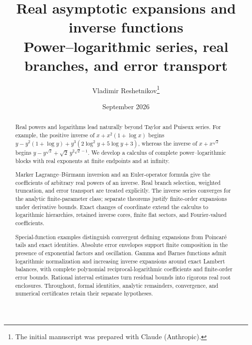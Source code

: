 \documentclass[11pt,a4paper]{article}
\title{Real asymptotic expansions and inverse functions\\[0.4em]
\large Power--logarithmic series, real branches, and error transport}
\author{Vladimir Reshetnikov\thanks{The initial manuscript was prepared with Claude (Anthropic).}}
\date{September 2026}
\numberwithin{equation}{section}
\theoremstyle{plain}
\theoremstyle{definition}
\theoremstyle{remark}
\begin{document}
\maketitle

\begin{abstract}
Real powers and logarithms lead naturally beyond Taylor and Puiseux series.
For example, the positive inverse of $x+x^2(1+\log x)$ begins
$y-y^2(1+\log y)+y^3(2\log^2y+5\log y+3)$, whereas the inverse of
$x+x^{\sqrt2}$ begins $y-y^{\sqrt2}+\sqrt2\,y^{2\sqrt2-1}$.
We develop a calculus of complete power--logarithmic blocks with real
exponents at finite endpoints and at infinity.

Marker Lagrange--B\"urmann inversion and an Euler-operator formula give the
coefficients of arbitrary real powers of an inverse. Real branch selection,
weighted truncation, and error transport are treated explicitly. The inverse
series converges for the analytic finite-parameter class; separate theorems
justify finite-order expansions under derivative bounds. Exact changes of
coordinate extend the calculus to logarithmic hierarchies, retained inverse
cores, finite flat sectors, and Fourier-valued coefficients.

Special-function examples distinguish convergent defining expansions from
Poincar\'e tails and exact identities. Absolute error envelopes support finite
composition in the presence of exponential factors and oscillation. Gamma
and Barnes functions admit logarithmic normalization and increasing inverse
expansions around exact Lambert balances, with complete polynomial
reciprocal-logarithmic coefficients and finite-order error bounds.
Rational interval estimates turn residual bounds into rigorous real root
enclosures. Throughout, formal identities, analytic remainders, convergence,
and numerical certificates retain their separate hypotheses.
\end{abstract}

\tableofcontents
































\end{document}

